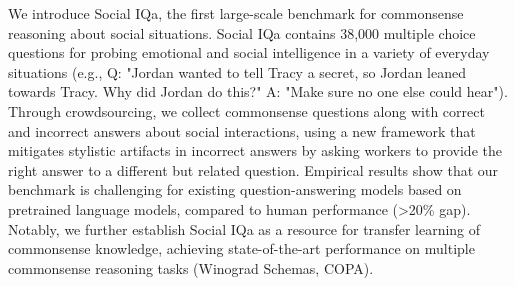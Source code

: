 We introduce Social IQa, the first large-scale benchmark for commonsense reasoning about social situations. Social IQa contains 38,000 multiple choice questions for probing emotional and social intelligence in a variety of everyday situations (e.g., Q: "Jordan wanted to tell Tracy a secret, so Jordan leaned towards Tracy. Why did Jordan do this?" A: "Make sure no one else could hear"). Through crowdsourcing, we collect commonsense questions along with correct and incorrect answers about social interactions, using a new framework that mitigates stylistic artifacts in incorrect answers by asking workers to provide the right answer to a different but related question. Empirical results show that our benchmark is challenging for existing question-answering models based on pretrained language models, compared to human performance (>20\% gap). Notably, we further establish Social IQa as a resource for transfer learning of commonsense knowledge, achieving state-of-the-art performance on multiple commonsense reasoning tasks (Winograd Schemas, COPA).